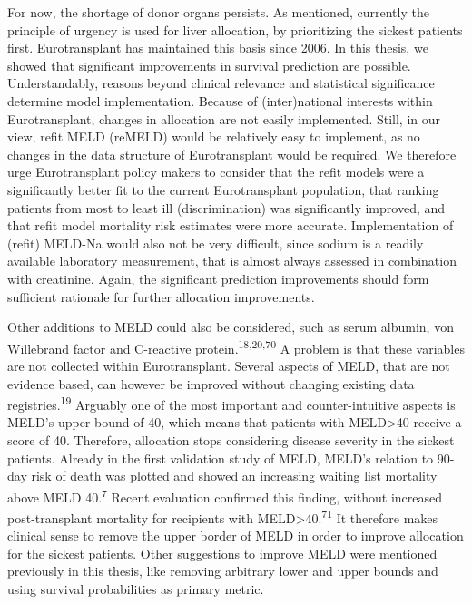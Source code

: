 \documentclass[11pt,english,]{book} %
\begin{document}
For now, the shortage of donor organs persists. As mentioned, currently the principle of urgency is used for liver allocation, by prioritizing the sickest patients first. Eurotransplant has maintained this basis since 2006. In this thesis, we showed that significant improvements in survival prediction are possible. Understandably, reasons beyond clinical relevance and statistical significance determine model implementation. Because of (inter)national interests within Eurotransplant, changes in allocation are not easily implemented. Still, in our view, refit MELD (reMELD) would be relatively easy to implement, as no changes in the data structure of Eurotransplant would be required. We therefore urge Eurotransplant policy makers to consider that the refit models were a significantly better fit to the current Eurotransplant population, that ranking patients from most to least ill (discrimination) was significantly improved, and that refit model mortality risk estimates were more accurate. Implementation of (refit) MELD-Na would also not be very difficult, since sodium is a readily available laboratory measurement, that is almost always assessed in combination with creatinine. Again, the significant prediction improvements should form sufficient rationale for further allocation improvements.

Other additions to MELD could also be considered, such as serum albumin, von Willebrand factor and C-reactive protein.\textsuperscript{18,20,70} A problem is that these variables are not collected within Eurotransplant. Several aspects of MELD, that are not evidence based, can however be improved without changing existing data registries.\textsuperscript{19} Arguably one of the most important and counter-intuitive aspects is MELD's upper bound of 40, which means that patients with MELD\textgreater40 receive a score of 40. Therefore, allocation stops considering disease severity in the sickest patients. Already in the first validation study of MELD, MELD's relation to 90-day risk of death was plotted and showed an increasing waiting list mortality above MELD 40.\textsuperscript{7} Recent evaluation confirmed this finding, without increased post-transplant mortality for recipients with MELD\textgreater40.\textsuperscript{71} It therefore makes clinical sense to remove the upper border of MELD in order to improve allocation for the sickest patients. Other suggestions to improve MELD were mentioned previously in this thesis, like removing arbitrary lower and upper bounds and using survival probabilities as primary metric.
\end{document}

